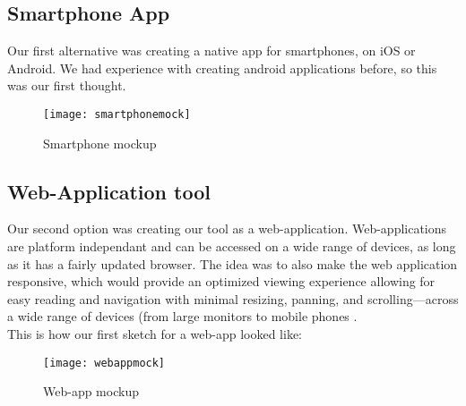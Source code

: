 \subsection{Smartphone App}
Our first alternative was creating a native app for smartphones, on iOS or Android. We had experience with creating android applications before, so this was our first thought. 
\begin{figure}[h!]
\label{smartphonemock}
\centering
	\texttt{[image: smartphonemock]}
\caption{Smartphone mockup}
\end{figure}

\subsection{Web-Application tool}
Our second option was creating our tool as a web-application. Web-applications are platform independant and can be accessed on a wide range of devices, as long as it has a fairly updated browser. The idea was to also make the web application responsive, which would provide an optimized viewing experience allowing for easy reading and navigation with minimal resizing, panning, and scrolling—across a wide range of devices (from large monitors to mobile phones .\\
This is how our first sketch for a web-app looked like: 
\begin{figure}[h!]
\label{webappmock}
\centering 
	\texttt{[image: webappmock]}
\caption{Web-app mockup}
\end{figure}

